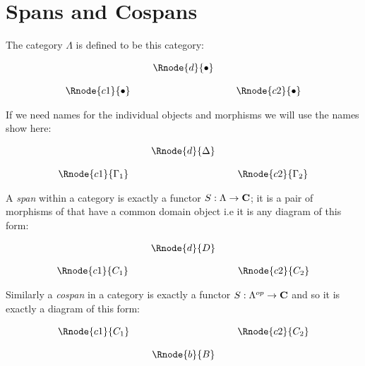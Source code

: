 \documentclass[10pt,a4paper]{scrartcl}
\begin{document}
 


\section{Spans and Cospans}
\noindent
The category $\Lambda$ is defined to be this category:
\begin{center}
\begin{displaymath}
\begin{array}{cp{0.1cm}cp{0.1cm} c}
            & &\Rnode{d}{\bullet}                  \\ [0.4cm]
\Rnode{c1}{\bullet}& &                & & \Rnode{c2}{\bullet} 
\end{array}
\end{displaymath}
\end{center}

\noindent
If we need names for the individual objects and morphisms we will use the names show here:
\begin{center}
\begin{displaymath}
\begin{array}{cp{0.1cm}cp{0.1cm} c}
            & &\Rnode{d}{\Delta}                  \\ [0.4cm]
\Rnode{c1}{\Gamma_1}& &                & & \Rnode{c2}{\Gamma_2} 
\end{array}
\end{displaymath}
\end{center}

\noindent
A \textit{span} within a category  is exactly a functor 
$S: \Lambda \rightarrow \textbf{C}$; it is a pair of morphisms of  that have a common domain object i.e it is any diagram of this form:

\begin{center}
\begin{equation}
\label{genericspan}
\begin{array}{cp{0.1cm}cp{0.1cm} c}
            & &\Rnode{d}{D}                  \\ [0.4cm]
\Rnode{c1}{C_1}& &                & & \Rnode{c2}{C_2} 
\end{array}
\end{equation}
\end{center}

\noindent Similarly a \textit{cospan} in a category  is exactly a functor $S: \Lambda^{op} \rightarrow \textbf{C}$ and so it is exactly a diagram of this form:
\begin{center}
\begin{equation}
\label{genericcospan}
\begin{array}{cp{0.1cm}cp{0.1cm} c}
\Rnode{c1}{C_1}& &                & & \Rnode{c2}{C_2} \\ [0.4cm]
            & &\Rnode{b}{B}
\end{array}
\end{equation}
\end{center}
\end{document}
